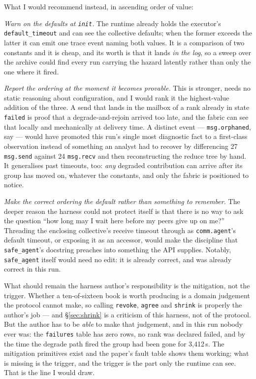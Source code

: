 \documentclass[11pt]{article}
\begin{document}
What I would recommend instead, in ascending order of value:

\emph{Warn on the defaults at \texttt{init}.} The runtime already holds the executor's
\texttt{default\_timeout} and can see the collective defaults; when the former exceeds the
latter it can emit one trace event naming both values. It is a comparison of two constants
and it is cheap, and its worth is that it lands \emph{in the log}, so a sweep over the
archive could find every run carrying the hazard latently rather than only the one where
it fired.

\emph{Report the ordering at the moment it becomes provable.} This is stronger, needs no
static reasoning about configuration, and I would rank it the highest-value addition of
the three. A send that lands in the mailbox of a rank already in state \texttt{failed} is
proof that a degrade-and-rejoin arrived too late, and the fabric can see that locally and
mechanically at delivery time. A distinct event --- \texttt{msg.orphaned}, say --- would
have promoted this run's single most diagnostic fact to a first-class observation instead
of something an analyst had to recover by differencing 27 \texttt{msg.send} against 24
\texttt{msg.recv} and then reconstructing the reduce tree by hand. It generalises past
timeouts, too: \emph{any} degraded contribution can arrive after its group has moved on,
whatever the constants, and only the fabric is positioned to notice.

\emph{Make the correct ordering the default rather than something to remember.} The deeper
reason the harness could not protect itself is that there is no way to ask the question
``how long may I wait here before my peers give up on me?'' Threading the enclosing
collective's receive timeout through as \texttt{comm.agent}'s default timeout, or exposing
it as an accessor, would make the discipline that \texttt{safe\_agent}'s docstring preaches
into something the API supplies. Notably, \texttt{safe\_agent} itself would need no edit:
it is already correct, and was already correct in this run.

What should remain the harness author's responsibility is the mitigation, not the trigger.
Whether a ten-of-sixteen book is worth producing is a domain judgement the protocol cannot
make, so calling \texttt{revoke}, \texttt{agree} and \texttt{shrink} is properly the
author's job --- and \S\ref{sec:shrink} is a criticism of this harness, not of the
protocol. But the author has to be \emph{able} to make that judgement, and in this run
nobody ever was: the \texttt{failures} table has zero rows, no rank was declared failed,
and by the time the degrade path fired the group had been gone for 3{,}412\,s. The
mitigation primitives exist and the paper's fault table shows them working; what is
missing is the trigger, and the trigger is the part only the runtime can see. That is the
line I would draw.
\end{document}
